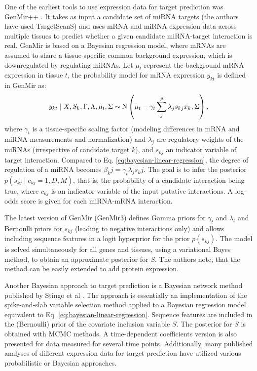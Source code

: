 One of the earliest tools to use expression data for target prediction was
GenMir++ \citep{Huang2007}. It takes as input a candidate set of miRNA targets (the authors
have used TargetScanS) and uses mRNA and miRNA expression data across multiple tissues
to predict whether a given candidate miRNA-target interaction is real.
GenMir is based on a Bayesian regression model, where
mRNAs are assumed to share a tissue-specific common background expression,
which is downregulated by regulating miRNAs. Let $\mu_t$ represent the
background mRNA expression in tissue $t$, the probability model for
mRNA expression $y_{kt}$ is defined in GenMir as:
\begin{equation}
  y_{kt} \mid X, S_k, \Gamma, \Lambda, \mu_t, \Sigma \sim \textup{N} \left( \mu_t - \gamma_t \sum_j^p \lambda_j s_{kj} x_k, \Sigma \right),
\end{equation}
where $\gamma_t$ is a tissue-specific scaling factor (modeling differences in
mRNA and miRNA measurements and normalization) and $\lambda_j$ are regulatory
weights of the miRNAs (irrespective of candidate target $k$), and $s_{kj}$ an
indicator variable of target interaction. Compared to Eq.
\eqref{eq:bayesian-linear-regression}, the degree of regulation of a miRNA becomes $\beta_kj =
\gamma_t \lambda_j s_kj$. The goal is to infer the posterior
$p(s_{kj} \mid c_{kj} = 1, D, M)$, that is, the probability of a candidate interaction being true,
where $c_{kj}$ is an indicator variable of the input putative interactions.
A log-odds score is given for each miRNA-mRNA interaction.

The latest version of GenMir (GenMir3) defines Gamma priors for $\gamma_t$ and
$\lambda_t$ and Bernoulli priors for $s_{kj}$ (leading to negative
interactions only) and allows including sequence features in a logit
hyperprior for the prior $p(s_{kj})$. The model is solved simultaneously for
all genes and tissues, using a variational Bayes method, to obtain an
approximate posterior for $S$. The authors note, that the method can be easily
extended to add protein expression.

Another Bayesian approach to target prediction is a Bayesian network method published by Stingo et al
\citep{Stingo2010}. The approach is essentially an implementation of the spike-and-slab variable
selection method \citep{Vehtari2012} applied to a Bayesian regression model
equivalent to Eq. \eqref{eq:bayesian-linear-regression}. Sequence features are
included in the (Bernoulli) prior of the covariate inclusion variable $S$. The
posterior for $S$ is obtained with MCMC methods. A time-dependent coefficients version
is also presented for data measured for several time points.
Additionally, many published analyses of different expression data for target prediction
have utilized various probabilistic or Bayesian approaches.
